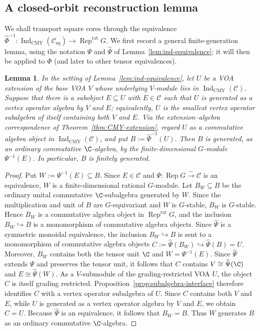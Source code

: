 \documentclass[12pt,leqno]{amsart}
\numberwithin{equation}{section} \newtheorem{thm}{Theorem}[section] \newtheorem{lem}[thm]{Lemma} \newtheorem{ex}[thm]{Example} \newtheorem{prop}[thm]{Proposition} \newtheorem{cor}[thm]{Corollary} \newtheorem{defi}[thm]{Definition} \newtheorem{rmk}[thm]{Remark} \newtheorem{notation}[thm]{Notation}
\newcommand{\Rep}{\operatorname{Rep}}
\newcommand{\Csq}{\mathcal C_{\mathrm{sq}}}
\newcommand{\IndCMY}{\operatorname{Ind}_{\mathrm{CMY}}}
\begin{document}
\subsection{A closed-orbit reconstruction lemma}

We shall transport square cores through the equivalence \(\widehat\Phi^{-1}:\IndCMY(\Csq)\longrightarrow\Rep^{\mathrm{rat}}G.\) We first record a general finite-generation lemma, using the notation $\Psi$ and $\widehat\Psi$ of Lemma~\ref{lem:ind-equivalence}; it will then be applied to $\Phi$ (and later to other tensor equivalences).

\begin{lem}\label{lem:finite-generation}
In the setting of Lemma~\ref{lem:ind-equivalence}, let $U$ be a VOA extension of the base VOA $V$ whose underlying $V$-module lies in $\IndCMY(\mathcal C)$. Suppose that there is a subobject $E\subseteq U$ with $E\in\mathcal C$ such that $U$ is generated as a vertex operator algebra by $V$ and $E$; equivalently, $U$ is the smallest vertex operator subalgebra of itself containing both $V$ and $E$. Via the extension--algebra correspondence of Theorem~\ref{thm:CMY-extension}, regard $U$ as a commutative algebra object in $\IndCMY(\mathcal C)$, and put $ B:=\widehat\Psi^{-1}(U). $ Then $B$ is generated, as an ordinary commutative $\C$-algebra, by the finite-dimensional $G$-module $\Psi^{-1}(E)$. In particular, $B$ is finitely generated.
\end{lem}

\begin{proof}
Put $W:=\Psi^{-1}(E)\subseteq B$. Since $E\in\mathcal C$ and $\Psi:\Rep G\overset{\sim}{\longrightarrow}\mathcal C$ is an equivalence, $W$ is a finite-dimensional rational $G$-module. Let $B_W\subseteq B$ be the ordinary unital commutative $\C$-subalgebra generated by $W$. Since the multiplication and unit of $B$ are $G$-equivariant and $W$ is $G$-stable, $B_W$ is $G$-stable. Hence \(B_W\) is a commutative algebra object in \(\Rep^{\mathrm{rat}}G\), and the inclusion $ B_W\hookrightarrow B $ is a monomorphism of commutative algebra objects. Since \(\widehat\Psi\) is a symmetric monoidal equivalence, the inclusion \(B_W\hookrightarrow B\) is sent to a monomorphism of commutative algebra objects $ C:=\widehat\Psi(B_W)\hookrightarrow \widehat\Psi(B)=U. $ Moreover, \(B_W\) contains both the tensor unit \(\C\) and \(W=\Psi^{-1}(E)\). Since \(\widehat\Psi\) extends \(\Psi\) and preserves the tensor unit, it follows that \(C\) contains \(V\cong\widehat\Psi(\C)\) and \(E\cong\widehat\Psi(W)\). As a $V$-submodule of the grading-restricted VOA $U$, the object $C$ is itself grading restricted. Proposition~\ref{prop:subalgebra-interface} therefore identifies $C$ with a vertex operator subalgebra of $U$. Since $C$ contains both $V$ and $E$, while $U$ is generated as a vertex operator algebra by $V$ and $E$, we obtain $C=U$. Because $\widehat\Psi$ is an equivalence, it follows that $B_W=B$. Thus $W$ generates $B$ as an ordinary commutative $\C$-algebra.
\end{proof}
\end{document}
